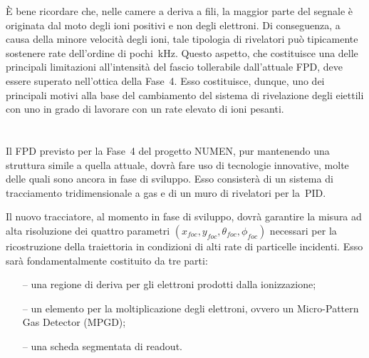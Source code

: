 È bene ricordare che, nelle camere a deriva a fili, la maggior parte del segnale è originata dal moto degli ioni positivi e non degli elettroni.
Di conseguenza, a causa della minore velocità degli ioni, tale tipologia di rivelatori può tipicamente sostenere rate dell'ordine di pochi~kHz. 
Questo aspetto, che costituisce una delle principali limitazioni all'intensità del fascio tollerabile dall'attuale FPD, deve essere superato nell'ottica della Fase~4. 
Esso costituisce, dunque, uno dei principali motivi alla base del cambiamento del sistema di rivelazione degli eiettili con uno in grado di lavorare con un rate elevato di ioni pesanti. 

\vspace{0.5 cm}

\section{}




Il FPD previsto per la Fase~4 del progetto NUMEN, pur mantenendo una struttura simile a quella attuale, dovrà fare uso di tecnologie innovative, molte delle quali sono ancora in fase di sviluppo.
Esso consisterà di un sistema di tracciamento tridimensionale a gas e di un muro di rivelatori per la~PID.


Il nuovo tracciatore, al momento in fase di sviluppo, dovrà garantire la misura ad alta risoluzione dei quattro parametri $ \left(  x_{foc}, y_{foc}, \theta_{foc}, \phi_{foc}  \right)$ necessari per la ricostruzione della traiettoria in condizioni di alti rate di particelle incidenti. 
Esso sarà fondamentalmente costituito da tre parti:
\begin{itemize}
	\item[--] una regione di deriva per gli elettroni prodotti dalla ionizzazione;
	\item[--] un elemento per la moltiplicazione degli elettroni, ovvero un Micro-Pattern Gas Detector (MPGD);
	\item[--] una scheda segmentata di readout.
\end{itemize}

